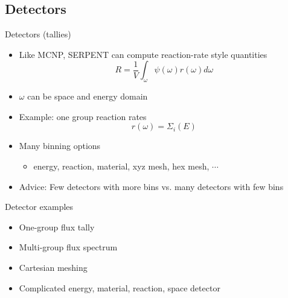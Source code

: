 \documentclass{beamer}
\begin{document}
\subsection{Detectors}
\begin{frame}{Detectors (tallies)}
    \begin{itemize}
        \item Like MCNP, SERPENT can compute reaction-rate style quantities
        \begin{equation}
            R = \frac{1}{V}\int_\omega\psi(\omega)r(\omega)d\omega
        \end{equation}
        \item $\omega$ can be space and energy domain
        \item Example: one group reaction rates
        \begin{equation}
            r(\omega) = \Sigma_i(E)
        \end{equation}
        \item Many binning options
        \begin{itemize}
            \item energy, reaction, material, xyz mesh, hex mesh, $\cdots$
        \end{itemize}
        \item{Advice: Few detectors with more bins vs. many detectors with few bins}
    \end{itemize}
\end{frame}

\begin{frame}{Detector examples}
    \begin{itemize}
        \item One-group flux tally
        \item Multi-group flux spectrum
        \item Cartesian meshing
        \item Complicated energy, material, reaction, space detector
    \end{itemize}
\end{frame}
\end{document}
